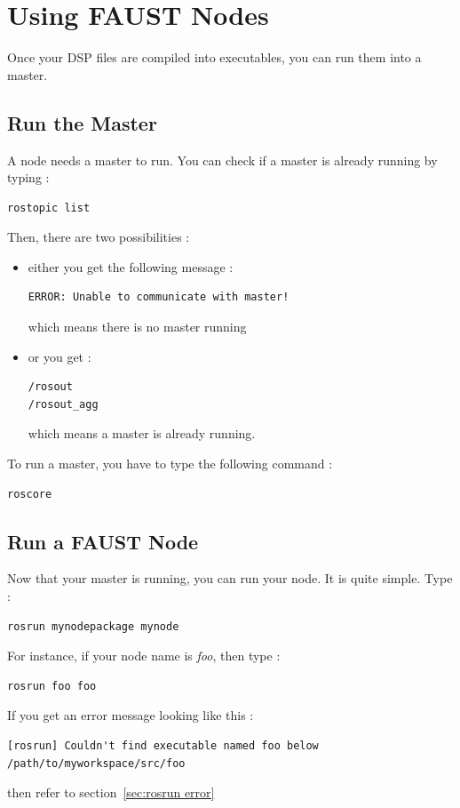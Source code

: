 \chapter{Using FAUST Nodes}
\label{chap:run}
Once your DSP files are compiled into \ros executables, you can run them into a \ros master.

\section{Run the Master}
A \faust node needs a master to run. You can check if a master is already running by typing :
\begin{lstlisting}
rostopic list
\end{lstlisting}
Then, there are two possibilities :
\begin{itemize}
	\item either you get the following message :
	\begin{lstlisting}
ERROR: Unable to communicate with master!
	\end{lstlisting}
	which means there is no master running
	\item or you get :
	\begin{lstlisting}
/rosout
/rosout_agg
	\end{lstlisting}
	which means a master is already running.
\end{itemize}
To run a master, you have to type the following command :
\begin{lstlisting}
roscore
\end{lstlisting}

\newpage
\section{Run a FAUST Node}
Now that your master is running, you can run your \faust node. It is quite simple. Type :
\begin{lstlisting}
rosrun mynodepackage mynode
\end{lstlisting}
For instance, if your node name is \textit{foo}, then type :
\begin{lstlisting}
rosrun foo foo
\end{lstlisting}
If you get an error message looking like this :
\begin{lstlisting}
[rosrun] Couldn't find executable named foo below /path/to/myworkspace/src/foo
\end{lstlisting}
then refer to section~\ref{sec:rosrun error}

